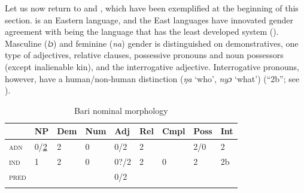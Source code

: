 \documentclass[output=collectionpaper]{langsci/langscibook}
\begin{document}
Let us now return to  and , which have been exemplified at the beginning of this section.  is an Eastern  language, and the East  languages have innovated gender agreement with  being the language that has the least developed system (\citealt[257]{Heine1983}). Masculine (\textit{lɔ}) and feminine (\textit{na}) gender is distinguished on demonstratives, one type of adjectives, relative clauses, possessive pronouns and noun possessors (except inalienable kin), and the interrogative adjective. Interrogative pronouns, however, have a human/non-human distinction (\textit{ŋa} `who', \textit{nyɔ} `what') (``2b''; see ).

\begin{table}
\caption{Bari nominal morphology}
\begin{tabular}{>{\scshape}l*{8}{l}}
\lsptoprule
  &	NP	&	Dem	&	Num	&	Adj	&	Rel	&	Cmpl	&	Poss	&	Int	\\
\midrule
adn	&	0/\uline{2}	&	2	&	0	&	0/2	&	2	&		&	2/0	&	2	\\
ind	&	1	&	2	&	0	&	0?/2	&	2	&	0	&	2	&	2b	\\
pred	&		&		&		&	0/2	&		&		&		&		\\
\lspbottomrule
\end{tabular}
\label{tab:WDG:10}
\end{table}
\end{document}
